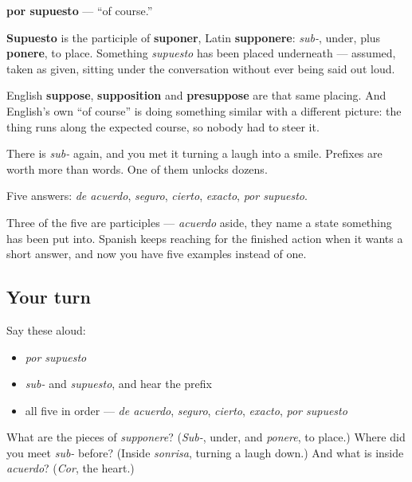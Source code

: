 \begin{cousinweb}
\textbf{por supuesto} — \textquotedblleft{}of course.\textquotedblright{}

\textbf{Supuesto} is the participle of \textbf{suponer}, Latin \textbf{supponere}: \emph{sub-}, under, plus \textbf{ponere}, to place. Something \emph{supuesto} has been placed underneath — assumed, taken as given, sitting under the conversation without ever being said out loud.

English \textbf{suppose}, \textbf{supposition} and \textbf{presuppose} are that same placing. And English's own \textquotedblleft{}of course\textquotedblright{} is doing something similar with a different picture: the thing runs along the expected course, so nobody had to steer it.

There is \emph{sub-} again, and you met it turning a laugh into a smile. Prefixes are worth more than words. One of them unlocks dozens.
\end{cousinweb}

\begin{grammarlens}[title={What you've built}]
Five answers: \emph{de acuerdo}, \emph{seguro}, \emph{cierto}, \emph{exacto}, \emph{por supuesto}.

Three of the five are participles — \emph{acuerdo} aside, they name a state something has been put into. Spanish keeps reaching for the finished action when it wants a short answer, and now you have five examples instead of one.
\end{grammarlens}

\subsection*{Your turn}
Say these aloud:

\begin{itemize}
\raggedright
  \item \emph{por supuesto}
  \item \emph{sub-} and \emph{supuesto}, and hear the prefix
  \item all five in order — \emph{de acuerdo}, \emph{seguro}, \emph{cierto}, \emph{exacto}, \emph{por supuesto}
\end{itemize}

\begin{tcolorbox}[breakable,colback=teal!4,colframe=teal!35!black,title={Before you move on}]
What are the pieces of \emph{supponere}? (\emph{Sub-}, under, and \emph{ponere}, to place.) Where did you meet \emph{sub-} before? (Inside \emph{sonrisa}, turning a laugh down.) And what is inside \emph{acuerdo}? (\emph{Cor}, the heart.)
\end{tcolorbox}
